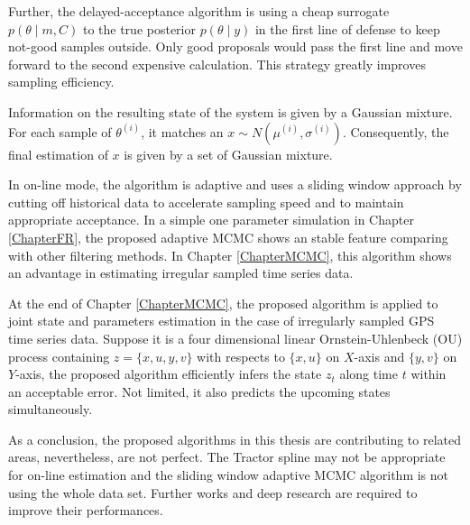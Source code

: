 Further, the delayed-acceptance algorithm is using a cheap surrogate $p(\theta\mid m,C)$ to the true posterior $p(\theta\mid y)$ in the first line of defense to keep not-good samples outside. Only good proposals would pass the first line and move forward to the second expensive calculation. This strategy greatly improves sampling efficiency. 


Information on the resulting state of the system is given by a Gaussian mixture. For each sample of $\theta^{(i)}$, it matches an $x \sim N(\mu^{(i)},\sigma^{(i)})$. Consequently, the final estimation of $x$ is given by a set of Gaussian mixture. 


In on-line mode, the algorithm is adaptive and uses a sliding window approach by cutting off historical data to accelerate sampling speed and to maintain appropriate acceptance. In a simple one parameter simulation in Chapter \ref{ChapterFR}, the proposed adaptive MCMC shows an stable feature comparing with other filtering methods. In Chapter \ref{ChapterMCMC}, this algorithm shows an advantage in estimating irregular sampled time series data. 


At the end of Chapter \ref{ChapterMCMC}, the proposed algorithm is applied to joint state and parameters estimation in the case of irregularly sampled GPS time series data. Suppose it is a four dimensional linear Ornstein-Uhlenbeck (OU) process containing $z=\{x,u,y,v\}$ with respects to $\{x,u\}$ on $X$-axis and $\{y,v\}$ on $Y$-axis, the proposed algorithm efficiently infers the state $z_t$ along time $t$ within an acceptable error. Not limited, it also predicts the upcoming states simultaneously. 


As a conclusion, the proposed algorithms in this thesis are contributing to related areas, nevertheless, are not perfect. The Tractor spline may not be appropriate for on-line estimation and the sliding window adaptive MCMC algorithm is not using the whole data set. Further works and deep research are required to improve their performances. 


